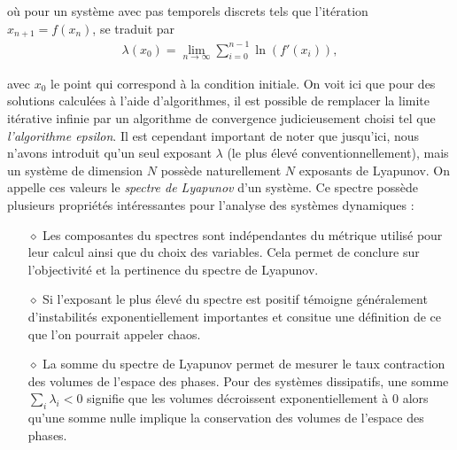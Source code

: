     où pour un système avec pas temporels discrets tels que l'itération $x_{n + 1} = f(x_n)$, se traduit par
    \begin{align}
        \lambda(x_0) = \lim_{n\to\infty}\sum_{i = 0}^{n - 1}\ln(f'(x_i)),
    \end{align}

    avec $x_0$ le point qui correspond à la condition initiale. On voit ici que pour des solutions calculées à l'aide d'algorithmes, il est possible de remplacer la limite itérative infinie par un algorithme de convergence judicieusement choisi tel que \textit{l'algorithme epsilon}. Il est cependant important de noter que jusqu'ici, nous n'avons introduit qu'un seul exposant $\lambda$ (le plus élevé conventionnellement), mais un système de dimension $N$ possède naturellement $N$ exposants de Lyapunov. On appelle ces valeurs le \textit{spectre de Lyapunov} d'un système. Ce spectre possède plusieurs propriétés intéressantes pour l'analyse des systèmes dynamiques \cite{LEs}: \\
    \begin{itemize}
        \item[$\diamond$] Les composantes du spectres sont indépendantes du métrique utilisé pour leur calcul ainsi que du choix des variables. Cela permet de conclure sur l'objectivité et la pertinence du spectre de Lyapunov. \\
        \item[$\diamond$] Si l'exposant le plus élevé du spectre est positif témoigne généralement d'instabilités exponentiellement importantes et consitue une définition de ce que l'on pourrait appeler chaos. \\
        \item[$\diamond$] La somme du spectre de Lyapunov permet de mesurer le taux contraction des volumes de l'espace des phases. Pour des systèmes dissipatifs, une somme $\sum_i\lambda_i < 0$ signifie que les volumes décroissent exponentiellement à 0 alors qu'une somme nulle implique la conservation des volumes de l'espace des phases.
    \end{itemize}
